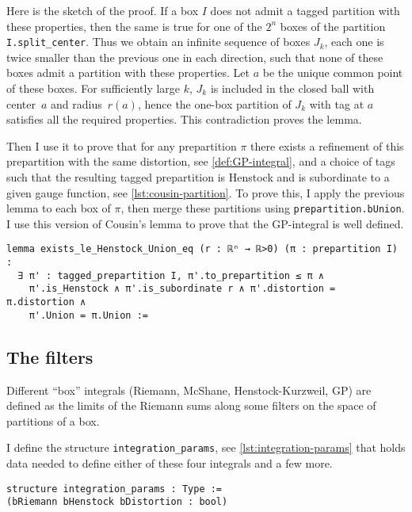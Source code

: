 \documentclass[a4paper, UKenglish,cleveref, autoref, thm-restate]{lipics-v2021}
\begin{document}
Here is the sketch of the proof. If a box \(I\) does not admit a
tagged partition with these properties, then the same is true for one
of the \(2^{n}\) boxes of the partition
\lstinline=I.split_center=. Thus we obtain an infinite sequence of
boxes \(J_{k}\), each one is twice smaller than the previous one in
each direction, such that none of these boxes admit a partition with
these properties. Let \(a\) be the unique common point of these
boxes. For sufficiently large \(k\), \(J_{k}\) is included in the
closed ball with center~\(a\) and radius~\(r(a)\), hence the one-box
partition of \(J_{k}\) with tag at \(a\) satisfies all the required
properties. This contradiction proves the lemma.

Then I use it to prove that for any prepartition \(\pi\) there exists
a refinement of this prepartition with the same distortion, see
\autoref{def:GP-integral}, and a choice of tags such that the
resulting tagged prepartition is Henstock and is subordinate to a
given gauge function, see \autoref{lst:cousin-partition}. To prove
this, I apply the previous lemma to each box of \(\pi\), then merge
these partitions using \lstinline=prepartition.bUnion=. I use this
version of Cousin's lemma to prove that the GP-integral is well
defined.

\begin{lstlisting}[caption={Cousin's lemma for a prepartition},label=lst:cousin-partition]
lemma exists_le_Henstock_Union_eq (r : ℝⁿ → ℝ>0) (π : prepartition I) :
  ∃ π' : tagged_prepartition I, π'.to_prepartition ≤ π ∧
    π'.is_Henstock ∧ π'.is_subordinate r ∧ π'.distortion = π.distortion ∧
    π'.Union = π.Union :=
\end{lstlisting}

\subsection{The filters}\label{sec:filters}

Different “box” integrals (Riemann, McShane, Henstock-Kurzweil, GP)
are defined as the limits of the Riemann sums along some filters on
the space of partitions of a box.

I define the structure \lstinline=integration_params=, see
\autoref{lst:integration-params} that holds data needed to define
either of these four integrals and a few more.

\begin{lstlisting}[caption={Structure holding parameters needed to define a box integral},label=lst:integration-params]
structure integration_params : Type :=
(bRiemann bHenstock bDistortion : bool)
\end{lstlisting}
\end{document}
